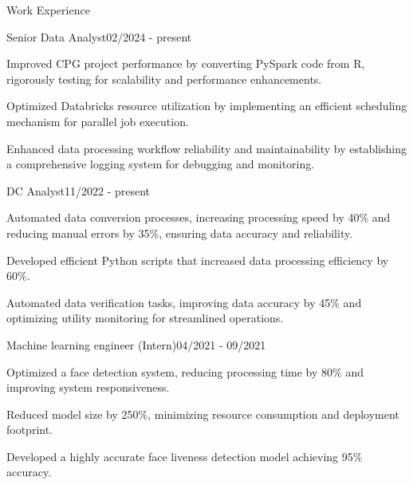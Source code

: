 \documentclass{resume} %
\begin{document}
    \begin{rSection}{Work Experience}
                    \begin{rSubsection}
                {Senior Data Analyst}{02/2024 - present}
                                    {}
                                {}
                                    \item Improved CPG project performance by converting PySpark code from R, rigorously testing for scalability and performance enhancements.
                                    \item Optimized Databricks resource utilization by implementing an efficient scheduling mechanism for parallel job execution.
                                    \item Enhanced data processing workflow reliability and maintainability by establishing a comprehensive logging system for debugging and monitoring.
                            \end{rSubsection}
                    \begin{rSubsection}
                {DC Analyst}{11/2022 - present}
                                    {}
                                {}
                                    \item Automated data conversion processes, increasing processing speed by 40\% and reducing manual errors by 35\%, ensuring data accuracy and reliability.
                                    \item Developed efficient Python scripts that increased data processing efficiency by 60\%.
                                    \item Automated data verification tasks, improving data accuracy by 45\% and optimizing utility monitoring for streamlined operations.
                            \end{rSubsection}
                    \begin{rSubsection}
                {Machine learning engineer (Intern)}{04/2021 - 09/2021}
                                    {}
                                {}
                                    \item Optimized a face detection system, reducing processing time by 80\% and improving system responsiveness.
                                    \item Reduced model size by 250\%, minimizing resource consumption and deployment footprint.
                                    \item Developed a highly accurate face liveness detection model achieving 95\% accuracy.
                            \end{rSubsection}
            \end{rSection}
\end{document}
